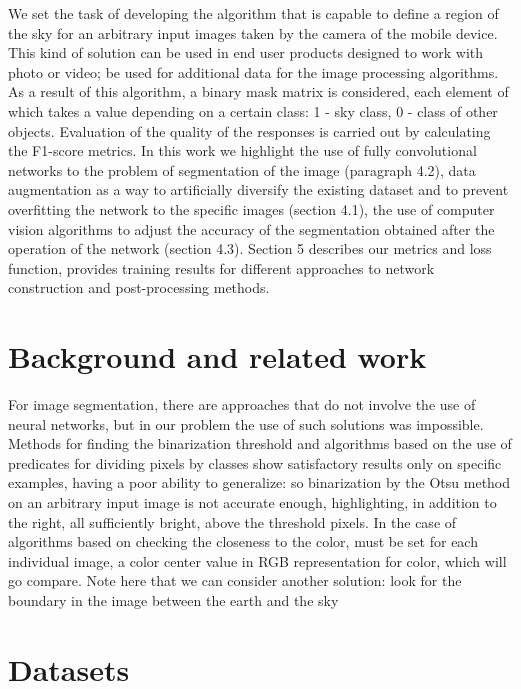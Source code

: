 \documentclass[runningheads]{llncs}
\begin{document}
We set the task of developing the algorithm that is capable to define a region of the sky for an arbitrary input images taken by the camera of the mobile device. This kind of solution can be used in end user products designed to work with photo or video; be used for additional data for the image processing algorithms\cite{ind_outd}. As a result of this algorithm, a binary mask matrix is considered, each element of which takes a value depending on a certain class: 1 - sky class, 0 - class of other objects. Evaluation of the quality of the responses is carried out by calculating the F1-score metrics.  In this work we highlight the use of fully convolutional networks to the problem of segmentation of the image (paragraph 4.2), data augmentation as a way to artificially diversify the existing dataset and to prevent overfitting the network to the specific images (section 4.1), the use of computer vision algorithms to adjust the accuracy of the segmentation obtained after the operation of the network (section 4.3). Section 5 describes our metrics and loss function, provides training results for different approaches to network construction and post-processing methods.

\section{Background and related work}

For image segmentation, there are approaches that do not involve the use of neural networks\cite{seg1}\cite{seg2}\cite{seg3}, but in our problem the use of such solutions was impossible. Methods for finding the binarization threshold and algorithms based on the use of predicates for dividing pixels by classes show satisfactory results only on specific examples, having a poor ability to generalize: so binarization by the Otsu method on an arbitrary input image is not accurate enough, highlighting, in addition to the right, all sufficiently bright, above the threshold pixels. In the case of algorithms based on checking the closeness to the color, must be set for each individual image, a color center value in RGB representation for color, which will go compare\cite{eff_app}. Note here that we can consider another solution: look for the boundary in the image between the earth and the sky\cite{ef_sky_detect}

\section{Datasets}
\end{document}
